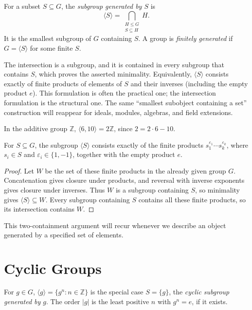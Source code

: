 \begin{definition}
For a subset \(S\subseteq G\), the \emph{subgroup generated by \(S\)} is
\[
\langle S\rangle=\bigcap_{\substack{H\leq G\\S\subseteq H}}H.
\]
It is the smallest subgroup of \(G\) containing \(S\).  A group is
\emph{finitely generated} if \(G=\langle S\rangle\) for some finite \(S\).
\end{definition}

The intersection is a subgroup, and it is contained in every subgroup that
contains \(S\), which proves the asserted minimality.  Equivalently,
\(\langle S\rangle\) consists exactly of finite products of elements of \(S\)
and their inverses (including the empty product \(e\)). This formulation is
often the practical one; the intersection formulation is the structural one.
The same ``smallest subobject containing a set'' construction will reappear for
ideals, modules, algebras, and field extensions.

\begin{example}
In the additive group \(\mathbb Z\), \(\langle6,10\rangle=2\mathbb Z\), since
\(2=2\cdot6-10\).
\end{example}

\begin{proposition}
For \(S\subseteq G\), the subgroup \(\langle S\rangle\) consists exactly of
the finite products \(s_1^{\varepsilon_1}\cdots s_k^{\varepsilon_k}\), where
\(s_i\in S\) and \(\varepsilon_i\in\{1,-1\}\), together with the empty
product \(e\).
\end{proposition}
\begin{proof}
Let \(W\) be the set of these finite products in the already given group
\(G\).  Concatenation gives closure under products, and reversal with inverse
exponents gives closure under inverses.
Thus \(W\) is a subgroup containing \(S\), so minimality gives
\(\langle S\rangle\subseteq W\).  Every subgroup containing \(S\) contains
all these finite products, so its intersection contains \(W\).
\end{proof}

This two-containment argument will recur whenever we describe an object
generated by a specified set of elements.

\section{Cyclic Groups}

For \(g\in G\), \(\langle g\rangle=\{g^n:n\in\mathbb Z\}\) is the special
case \(S=\{g\}\), the \emph{cyclic subgroup generated by \(g\)}.  The order
\(|g|\) is the least positive \(n\) with \(g^n=e\), if it exists.

